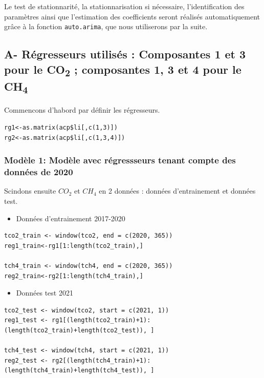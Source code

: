 \documentclass[a4paper,12pt]{report}%
\begin{document}
Le test de stationnarité, la stationnarisation si nécessaire, l’identification des paramètres ainsi que l’estimation des coefficients seront réalisés automatiquement grâce à la fonction \texttt{auto.arima}, que nous utiliserons par la suite.\\
 \vspace{2em}
 
\subsection*{A- Régresseurs utilisés : Composantes 1 et 3 pour le CO\textsubscript{2} ; composantes 1, 3 et 4 pour le CH\textsubscript{4} }


Commencons d'habord par définir les régresseurs.
\begin{lstlisting}
rg1<-as.matrix(acp$li[,c(1,3)]) 
rg2<-as.matrix(acp$li[,c(1,3,4)]) 
\end{lstlisting}

\subsubsection{Modèle 1:  Modèle avec régressseurs tenant compte des données de 2020}
Scindons ensuite $CO_2$ et $CH_4$ en 2 données : données d'entrainement et données test. \newline

\begin{itemize}
    \item Données d'entrainement 2017-2020
\end{itemize}

\begin{lstlisting}
tco2_train <- window(tco2, end = c(2020, 365)) 
reg1_train<-rg1[1:length(tco2_train),]

tch4_train <- window(tch4, end = c(2020, 365))
reg2_train<-rg2[1:length(tch4_train),] 
\end{lstlisting}

\begin{itemize}
    \item Données test 2021
\end{itemize}

\begin{lstlisting}
tco2_test <- window(tco2, start = c(2021, 1)) 
reg1_test <- rg1[(length(tco2_train)+1):(length(tco2_train)+length(tco2_test)), ]

tch4_test <- window(tch4, start = c(2021, 1)) 
reg2_test <- rg2[(length(tch4_train)+1):(length(tch4_train)+length(tch4_test)), ]
\end{lstlisting}
\end{document}
